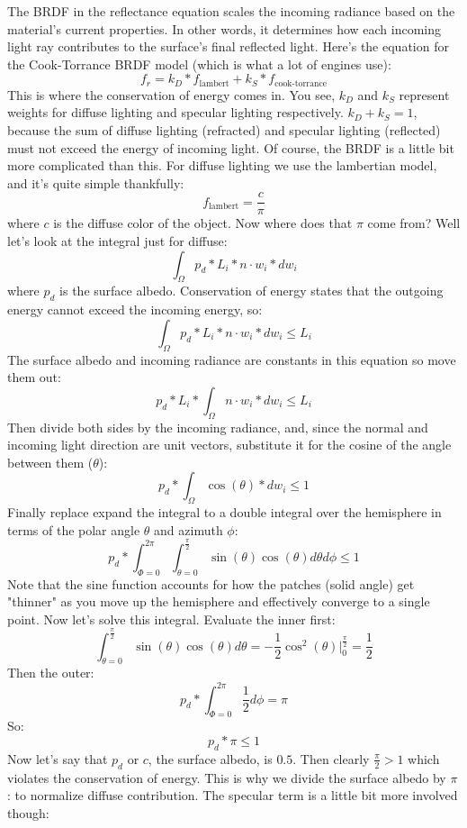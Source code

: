 \documentclass{article}
\begin{document}
The BRDF in the reflectance equation scales the incoming radiance based on the material's current properties. 
In other words, it determines how each incoming light ray contributes to the surface's final reflected light.
Here's the equation for the Cook-Torrance BRDF model (which is what a lot of engines use):
\[f_r = k_D * f_{\text{lambert}} + k_S * f_{\text{cook-torrance}}\]
This is where the conservation of energy comes in. You see, \(k_D\) and \(k_S\) represent 
weights for diffuse lighting and specular lighting respectively. \(k_D + k_S = 1\), because the sum of diffuse
lighting (refracted) and specular lighting (reflected) must not exceed the energy of incoming light. Of course, the BRDF
is a little bit more complicated than this. For diffuse lighting we use the lambertian model, and it's quite simple thankfully:
\[f_{\text{lambert}} = \frac{c}{\pi}\]
where \(c\) is the diffuse color of the object. Now where does that \(\pi\) come from? 
Well let's look at the integral just for diffuse: 
\[\int_{\Omega} p_d * L_i * n \cdot w_i * dw_i\] 
where \(p_d\) is the surface albedo. Conservation of energy states that the outgoing energy cannot exceed the incoming energy, so:
\[\int_{\Omega} p_d * L_i * n \cdot w_i * dw_i \leq L_i\] 
The surface albedo and incoming radiance are constants in this equation so move them out:
\[p_d * L_i * \int_{\Omega} n \cdot w_i * dw_i \leq L_i\]
Then divide both sides by the incoming radiance, and, since the normal and incoming light direction are unit vectors, substitute it for the cosine 
of the angle between them (\(\theta\)):
\[p_d * \int_{\Omega} \cos(\theta) * dw_i \leq 1\]
Finally replace expand the integral to a double integral over the hemisphere in terms of the polar angle \(\theta\) and azimuth \(\phi\):
\[p_d * \int_{\Phi = 0}^{2\pi} \int_{\theta = 0}^{\frac{\pi}{2}} \sin(\theta)\cos(\theta)d\theta d\phi \leq 1\]
Note that the sine function accounts for how the patches (solid angle) get "thinner" as you move up the hemisphere and effectively converge to
a single point. Now let's solve this integral. Evaluate the inner first:
\[\int_{\theta = 0}^{\frac{\pi}{2}} \sin(\theta)\cos(\theta)d\theta = -\frac{1}{2}{\cos}^2(\theta) \Big|_0^\frac{\pi}{2} = \frac{1}{2}\]
Then the outer:
\[p_d * \int_{\Phi = 0}^{2\pi} \frac{1}{2} d\phi = \pi \]
So:
\[p_d * \pi \leq 1\]
Now let's say that \(p_d\) or \(c\), the surface albedo, is \(0.5\).
Then clearly \(\frac{\pi}{2} > 1\) which violates the conservation of energy. This is why
we divide the surface albedo by \(\pi\): to normalize diffuse contribution.
The specular term is a little bit more involved though:
\end{document}
